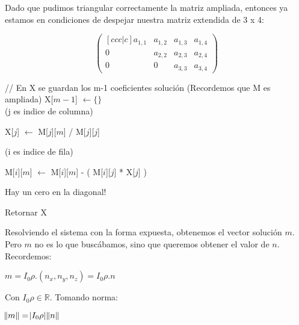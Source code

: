 Dado que pudimos triangular correctamente la matriz ampliada, entonces ya estamos en condiciones de despejar nuestra matriz extendida de 3 x 4:

\[
\begin{pmatrix}[ccc|c]
    a_{1,1}   & a_{1,2} & a_{1,3} & a_{1, 4} \\
    0         & a_{2,2} & a_{2,3} & a_{2, 4} \\
    0         & 0       & a_{3,3} & a_{3, 4}
\end{pmatrix}
\]

\begin{algorithm}[H]
\begin{algorithmic}


    // En X se guardan los m-1 coeficientes solución (Recordemos que M es ampliada)
    \State X[$m-1$] $\gets \{\}$ \\

      (j es indice de columna)


            \State X[$j$] $\gets$ M[$j$][$m$] / M[$j$][$j$]

              (i es indice de fila)

                \State M[$i$][$m$] $\gets$ M[$i$][$m$] - ( M[$i$][$j$] * X[$j$] )

            \EndFor

        \Else
            \State Hay un cero en la diagonal!
        \EndIf
    \EndFor

    \State Retornar X

\EndFunction
\end{algorithmic}
\end{algorithm}

Resolviendo el sistema con la forma expuesta, obtenemos el vector solución $m$. Pero $m$ no es lo que buscábamos, sino que queremos obtener el valor de $n$. Recordemos:

\begin{center}
$m = I_0 \rho . (n_x, n_y, n_z) = I_0 \rho . n$
\end{center}

Con $I_0 \rho \in \mathbb{R}$. Tomando norma:

\begin{center}
$\norm{m} = \abs{I_0 \rho} \norm{n}$
\end{center}

